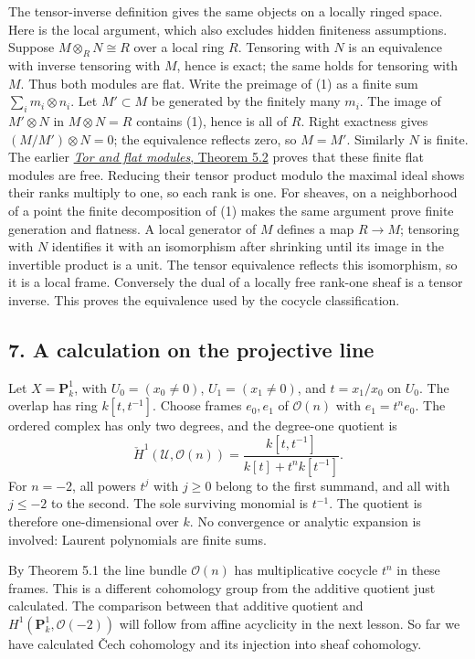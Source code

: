 \documentclass[11pt]{article}
\begin{document}
The tensor-inverse definition gives the same objects on a locally ringed
space. Here is the local argument, which also excludes hidden finiteness
assumptions. Suppose \(M\otimes_RN\cong R\) over a local ring \(R\).
Tensoring with \(N\) is an equivalence with inverse tensoring with
\(M\), hence is exact; the same holds for tensoring with \(M\). Thus
both modules are flat. Write the preimage of (1) as a finite sum
\(\sum_i m_i\otimes n_i\). Let \(M'\subset M\) be generated by the
finitely many \(m_i\). The image of \(M'\otimes N\) in \(M\otimes N=R\)
contains (1), hence is all of \(R\). Right exactness gives
\((M/M')\otimes N=0\); the equivalence reflects zero, so \(M=M'\).
Similarly \(N\) is finite. The earlier
\href{../AG-CA/AG-CA-07.html}{\emph{Tor and flat modules}, Theorem 5.2}
proves that these finite flat modules are free. Reducing their tensor
product modulo the maximal ideal shows their ranks multiply to one, so
each rank is one. For sheaves, on a neighborhood of a point the finite
decomposition of (1) makes the same argument prove finite generation and
flatness. A local generator of \(M\) defines a map \(R\to M\); tensoring
with \(N\) identifies it with an isomorphism after shrinking until its
image in the invertible product is a unit. The tensor equivalence
reflects this isomorphism, so it is a local frame. Conversely the dual
of a locally free rank-one sheaf is a tensor inverse. This proves the
equivalence used by the cocycle classification.

\subsection{7. A calculation on the projective
line}\label{a-calculation-on-the-projective-line}

Let \(X=\mathbf P^1_k\), with \(U_0=(x_0\ne0)\), \(U_1=(x_1\ne0)\), and
\(t=x_1/x_0\) on \(U_0\). The overlap has ring \(k[t,t^{-1}]\). Choose
frames \(e_0,e_1\) of \(\mathcal O(n)\) with \(e_1=t^n e_0\). The
ordered complex has only two degrees, and the degree-one quotient is \[
\check H^1(\mathcal U,\mathcal O(n))
=\frac{k[t,t^{-1}]}{k[t]+t^n k[t^{-1}]}.
\] For \(n=-2\), all powers \(t^j\) with \(j\geq0\) belong to the first
summand, and all with \(j\leq-2\) to the second. The sole surviving
monomial is \(t^{-1}\). The quotient is therefore one-dimensional over
\(k\). No convergence or analytic expansion is involved: Laurent
polynomials are finite sums.

By Theorem 5.1 the line bundle \(\mathcal O(n)\) has multiplicative
cocycle \(t^n\) in these frames. This is a different cohomology group
from the additive quotient just calculated. The comparison between that
additive quotient and \(H^1(\mathbf P^1_k,\mathcal O(-2))\) will follow
from affine acyclicity in the next lesson. So far we have calculated
Čech cohomology and its injection into sheaf cohomology.
\end{document}
